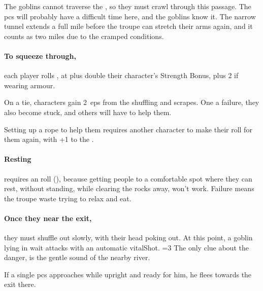 \begin{multicols}{2}

The goblins cannot traverse the , so they must crawl through this passage.
The \glspl{pc} will probably have a difficult time here, and the goblins know it.
The narrow tunnel extends a full mile before the troupe can stretch their arms again, and it counts as two miles due to the cramped conditions.

\paragraph{To squeeze through,}
each player rolls , at \tn[7] plus double their character's Strength Bonus, plus 2 if wearing armour.

On a tie, characters gain 2~\glspl{ep} from the shuffling and scrapes.
One a failure, they also become stuck, and others will have to help them.

Setting up a rope to help them requires another character to make their roll for them again, with +1 to the .


\paragraph{Resting}
requires an  roll (\tn[10]), because getting people to a comfortable spot where they can rest, without standing, while clearing the rocks away, won't work.
Failure means the troupe waste  trying to relax and eat.

\paragraph{Once they near the exit,}
they must shuffle out slowly, with their head poking out.
At this point, a goblin lying in wait attacks with an automatic \gls{vitalShot}.
\ifnum\value{temperature}=3%
  The only clue about the danger, is the gentle sound of the nearby river.
\fi%

If a single \glspl{pc} approaches while upright and ready for him, he flees towards the exit there.

\playCommentaryPuddle



\end{multicols}
